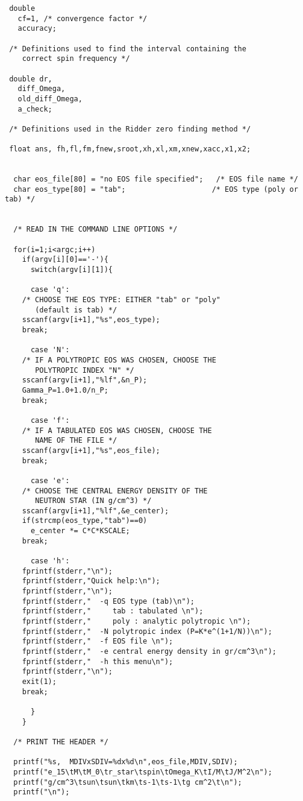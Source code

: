 \begin{verbatim}
 double
   cf=1, /* convergence factor */
   accuracy;

 /* Definitions used to find the interval containing the 
    correct spin frequency */

 double dr,
   diff_Omega,
   old_diff_Omega,
   a_check;
   
 /* Definitions used in the Ridder zero finding method */
 
 float ans, fh,fl,fm,fnew,sroot,xh,xl,xm,xnew,xacc,x1,x2;


  char eos_file[80] = "no EOS file specified";   /* EOS file name */
  char eos_type[80] = "tab";                    /* EOS type (poly or tab) */
 

  /* READ IN THE COMMAND LINE OPTIONS */

  for(i=1;i<argc;i++) 
    if(argv[i][0]=='-'){
      switch(argv[i][1]){

      case 'q':
	/* CHOOSE THE EOS TYPE: EITHER "tab" or "poly"
	   (default is tab) */
	sscanf(argv[i+1],"%s",eos_type);
	break;
               
      case 'N':
	/* IF A POLYTROPIC EOS WAS CHOSEN, CHOOSE THE 
	   POLYTROPIC INDEX "N" */
	sscanf(argv[i+1],"%lf",&n_P);
	Gamma_P=1.0+1.0/n_P;
	break;               

      case 'f':
	/* IF A TABULATED EOS WAS CHOSEN, CHOOSE THE
	   NAME OF THE FILE */
	sscanf(argv[i+1],"%s",eos_file);
	break;

      case 'e':
	/* CHOOSE THE CENTRAL ENERGY DENSITY OF THE 
	   NEUTRON STAR (IN g/cm^3) */
	sscanf(argv[i+1],"%lf",&e_center);
	if(strcmp(eos_type,"tab")==0)
	  e_center *= C*C*KSCALE;
	break;
		
      case 'h': 
	fprintf(stderr,"\n");
	fprintf(stderr,"Quick help:\n");
	fprintf(stderr,"\n");
	fprintf(stderr,"  -q EOS type (tab)\n"); 
	fprintf(stderr,"     tab : tabulated \n");
	fprintf(stderr,"     poly : analytic polytropic \n");           
	fprintf(stderr,"  -N polytropic index (P=K*e^(1+1/N))\n");  
	fprintf(stderr,"  -f EOS file \n");
	fprintf(stderr,"  -e central energy density in gr/cm^3\n");
	fprintf(stderr,"  -h this menu\n");
	fprintf(stderr,"\n");
	exit(1);
	break;
     
      }
    }

  /* PRINT THE HEADER */

  printf("%s,  MDIVxSDIV=%dx%d\n",eos_file,MDIV,SDIV);
  printf("e_15\tM\tM_0\tr_star\tspin\tOmega_K\tI/M\tJ/M^2\n");
  printf("g/cm^3\tsun\tsun\tkm\ts-1\ts-1\tg cm^2\t\n");
  printf("\n");



\end{verbatim}
